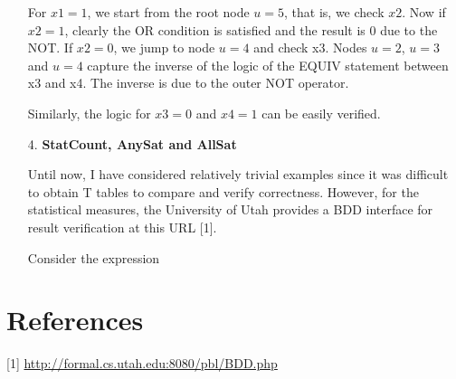 \documentclass[a4paper, titlepage, 12pt]{article}
\numberwithin{equation}{section}
\begin{document}
\begin{itemize}
                    For $x1 = 1$, we start from the root node $u = 5$, that is, we check $x2$.
                    Now if $x2 = 1$, clearly the OR condition is satisfied and the result is 0 due to the NOT.
                    If $x2 = 0$, we jump to node $u = 4$ and check x3.
                    Nodes $u = 2$, $u = 3$ and $u = 4$ capture the inverse of the logic of the EQUIV statement between x3 and x4.
                    The inverse is due to the outer NOT operator.

                    Similarly, the logic for $x3 = 0$ and $x4 = 1$ can be easily verified.

                \item[4.] \textbf{StatCount, AnySat and AllSat}
                
                    Until now, I have considered relatively trivial examples since it was difficult to obtain T tables to compare and verify correctness.
                    However, for the statistical measures, the University of Utah provides a BDD interface for result verification at this URL [1].

                    Consider the expression 

            \end{itemize}
    
    \section{References}

            [1]  \href{http://formal.cs.utah.edu:8080/pbl/BDD.php}{http://formal.cs.utah.edu:8080/pbl/BDD.php}
\end{document}
